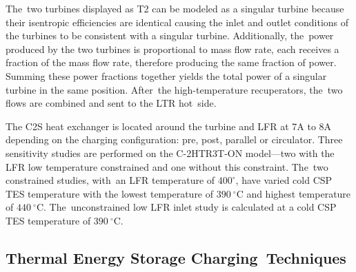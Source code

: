 \documentclass[sustainability,article,accept,moreauthors,pdftex]{Definitions/mdpi}
\begin{document}
\begin{paracol}{2}
  \switchcolumn
  
  
  The~two turbines displayed as T2 can be modeled as a singular turbine because their isentropic efficiencies are identical causing the inlet and outlet conditions of the turbines to be consistent with a singular turbine. Additionally, the~power produced by the two turbines is proportional to mass flow rate, each receives a fraction of the mass flow rate, therefore producing the same fraction of power. Summing these power fractions together yields the total power of a singular turbine in the same position. After~the high-temperature recuperators, the~two flows are combined and sent to the LTR hot~side. 
  
  The C2S heat exchanger is located around the turbine and LFR at 7A to 8A depending on the charging configuration: pre, post, parallel or circulator. Three sensitivity studies are performed on the C-2HTR3T-ON model---two with the LFR low temperature constrained and one without this constraint. The~two constrained studies, with~an LFR temperature of $400^{\circ}$, have varied cold CSP TES temperature with the lowest temperature of $390~^{\circ}$C and highest temperature of $440~^{\circ}$C. The~unconstrained low LFR inlet study is calculated at a cold CSP TES temperature of $390~^{\circ}$C.



\subsection{Thermal Energy Storage Charging~Techniques} 


\end{paracol}
\end{document}
